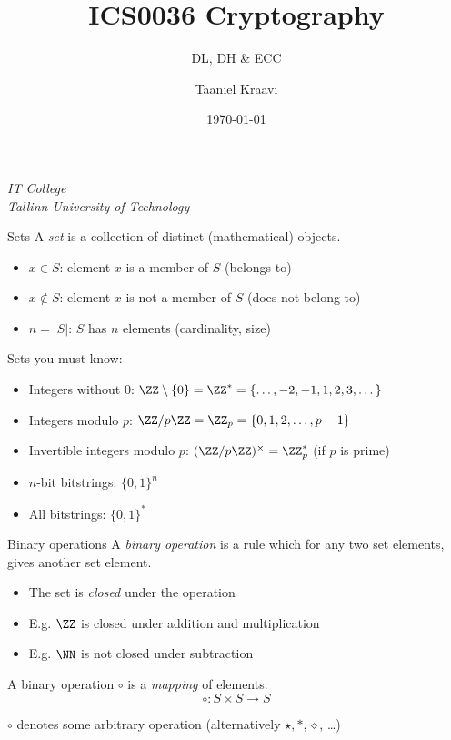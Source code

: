 \graphicspath{ {../../images/} }
\usetikzlibrary{external}

\usepackage{pgfplots}

\title{ICS0036 Cryptography}
\subtitle{DL, DH \& ECC}
\date{\today}
\author{Taaniel Kraavi}
\institute%
{%
  \textit{IT College}\\
  \textit{Tallinn University of Technology}
}


\begin{frame}
  \titlepage
\end{frame}
 
\begin{frame}{Sets}
  A \emph{set} is a collection of distinct (mathematical) objects.
  \begin{itemize}[<+(1)->]
    \item $x\in S$: element $x$ is a member of $S$ (belongs to)
    \item $x\notin S$: element $x$ is not a member of $S$ (does not belong to)
    \item $n = \lvert S\rvert$: $S$ has $n$ elements (cardinality, size)
  \end{itemize}

  \pause
  Sets you must know:
  \begin{itemize}[<+(1)->]
    \item Integers without $0$: $\ZZ\setminus\{0\}=\ZZ^*=\{\dots, -2, -1, 1, 2, 3, \dots\}$
    \item Integers modulo $p$: $\ZZ/p\ZZ = \ZZ_p = \{0, 1, 2, \dots, p-1\}$
    \item Invertible integers modulo $p$: $(\ZZ/p\ZZ)^\times = \ZZ_p^*$ (if $p$ is prime)
    \item $n$-bit bitstrings: $\{0, 1\}^n$
    \item All bitstrings: $\{0, 1\}^*$
  \end{itemize}
\end{frame}

\begin{frame}{Binary operations}
  A \emph{binary operation} is a rule which for any two set elements, gives another set element.
  \begin{itemize}[<+(1)->]
    \item The set is \emph{closed} under the operation
    \item E.g. $\ZZ$ is closed under addition and multiplication
    \item E.g. $\NN$ is not closed under subtraction
  \end{itemize}

  \pause
  A binary operation $\circ$ is a \emph{mapping} of elements:
  \[
    \circ: S \times S \to S
  \]

  \pause
  $\circ$ denotes some arbitrary operation (alternatively $\star, \ast, \diamond$, \dots)
\end{frame}

